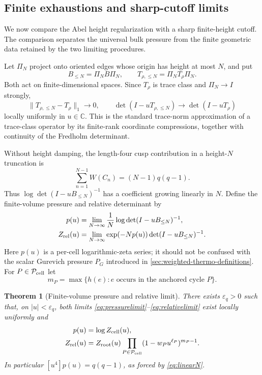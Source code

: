 \documentclass[11pt,reqno]{amsart}
\numberwithin{equation}{section}
\newtheorem{theorem}{Theorem}[section]
\theoremstyle{definition}
\theoremstyle{remark}
\begin{document}
\subsection{Finite exhaustions and sharp-cutoff limits}
\label{sec:exhaustion}

We now compare the Abel height regularization with a sharp finite-height
cutoff.  The comparison separates the universal bulk pressure from the finite
geometric data retained by the two limiting procedures.

Let $\Pi_N$ project onto oriented edges whose origin has height at most $N$, and
put
\[
 B_{\le N}=\Pi_NB\Pi_N,
 \qquad
 T_{\rho,\le N}=\Pi_NT_\rho\Pi_N.
\]
Both act on finite-dimensional spaces.
Since $T_\rho$ is trace class and $\Pi_N\to I$ strongly,
\[
 \|T_{\rho,\le N}-T_\rho\|_1\longrightarrow0,
 \qquad
 \det(I-uT_{\rho,\le N})\longrightarrow\det(I-uT_\rho)
\]
locally uniformly in $u\in\mathbb C$.  This is the standard trace-norm
approximation of a trace-class operator by its finite-rank coordinate
compressions, together with continuity of the Fredholm determinant.

Without height damping, the length-four cusp contribution in a height-$N$
truncation is
\begin{equation}\label{eq:linearN}
 \sum_{n=1}^{N-1}W(C_n)=(N-1)q(q-1).
\end{equation}
Thus $\log\det(I-uB_{\le N})^{-1}$ has a coefficient growing linearly in $N$.
Define the finite-volume pressure and relative determinant by
\begin{align}
 p(u)&=\lim_{N\to\infty}\frac1N\log\det(I-uB_{\le N})^{-1},
 \label{eq:pressurelimit}\\
 Z_{\rm rel}(u)&=\lim_{N\to\infty}
 \exp(-N p(u))\det(I-uB_{\le N})^{-1}.
 \label{eq:relativelimit}
\end{align}
Here $p(u)$ is a per-cell logarithmic-zeta series; it should not be confused
with the scalar Gurevich pressure $P_G$ introduced in
\cref{sec:weighted-thermo-definitions}.
For $P\in\mathcal P_{\rm cell}$ let
\begin{equation}\label{eq:maxheight}
 m_P=\max\{h(e):e\text{ occurs in the anchored cycle }P\}.
\end{equation}

\begin{theorem}[Finite-volume pressure and relative limit]
\label{thm:finite-renormalized}
There exists $\varepsilon_q>0$ such that, on $|u|<\varepsilon_q$, both limits
\eqref{eq:pressurelimit}--\eqref{eq:relativelimit} exist locally uniformly and
\begin{align}
 p(u)&=\log Z_{\rm cell}(u),\label{eq:finitepressureexact}\\
 Z_{\rm rel}(u)&=Z_{\rm root}(u)
 \prod_{P\in\mathcal P_{\rm cell}}
 (1-w_Pu^{\ell_P})^{m_P-1}.
 \label{eq:finiterelativeexact}
\end{align}
In particular $[u^4]p(u)=q(q-1)$, as forced by \eqref{eq:linearN}.
\end{theorem}
\end{document}
